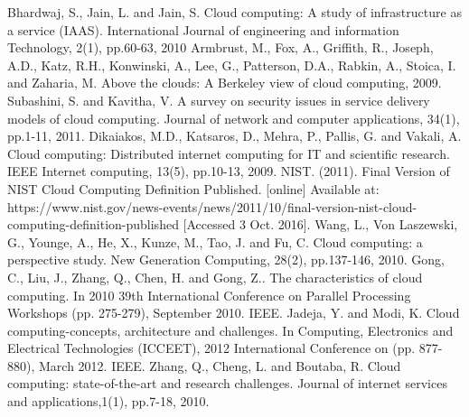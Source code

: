 \documentclass[10pt,journal,compsoc]{IEEEtran}
\begin{document}
\ifCLASSOPTIONcaptionsoff
  \newpage
\fi



\begin{thebibliography}{1}

 Bhardwaj, S., Jain, L. and Jain, S. Cloud computing: A study of infrastructure as a service (IAAS). International Journal of engineering and information Technology, 2(1), pp.60-63, 2010
\vspace{5mm}
\bibitem{}
 Armbrust, M., Fox, A., Griffith, R., Joseph, A.D., Katz, R.H., Konwinski, A., Lee, G., Patterson, D.A., Rabkin, A., Stoica, I. and Zaharia, M. Above the clouds: A Berkeley view of cloud computing, 2009.
\vspace{5mm}
\bibitem{}
Subashini, S. and Kavitha, V. A survey on security issues in service delivery models of cloud computing. Journal of network and computer applications, 34(1), pp.1-11, 2011.
\vspace{5mm}
\bibitem{}
Dikaiakos, M.D., Katsaros, D., Mehra, P., Pallis, G. and Vakali, A. Cloud computing: Distributed internet computing for IT and scientific research. IEEE Internet computing, 13(5), pp.10-13, 2009.
\vspace{5mm}
\bibitem{}
NIST. (2011). Final Version of NIST Cloud Computing Definition Published. [online] Available at: https://www.nist.gov/news-events/news/2011/10/final-version-nist-cloud-computing-definition-published [Accessed 3 Oct. 2016].
\vspace{5mm}
\bibitem{}
Wang, L., Von Laszewski, G., Younge, A., He, X., Kunze, M., Tao, J. and Fu, C. Cloud computing: a perspective study. New Generation Computing, 28(2), pp.137-146, 2010.
\vspace{5mm}
\bibitem{}
Gong, C., Liu, J., Zhang, Q., Chen, H. and Gong, Z.. The characteristics of cloud computing. In 2010 39th International Conference on Parallel Processing Workshops (pp. 275-279), September 2010.  IEEE.
\vspace{5mm}
\bibitem{}
Jadeja, Y. and Modi, K. Cloud computing-concepts, architecture and challenges. In Computing, Electronics and Electrical Technologies (ICCEET), 2012 International Conference on (pp. 877-880), March 2012. IEEE.
\vspace{5mm}
\bibitem{}
Zhang, Q., Cheng, L. and Boutaba, R. Cloud computing: state-of-the-art and research challenges. Journal of internet services and applications,1(1), pp.7-18, 2010.
\vspace{5mm}


\end{thebibliography}
\end{document}
